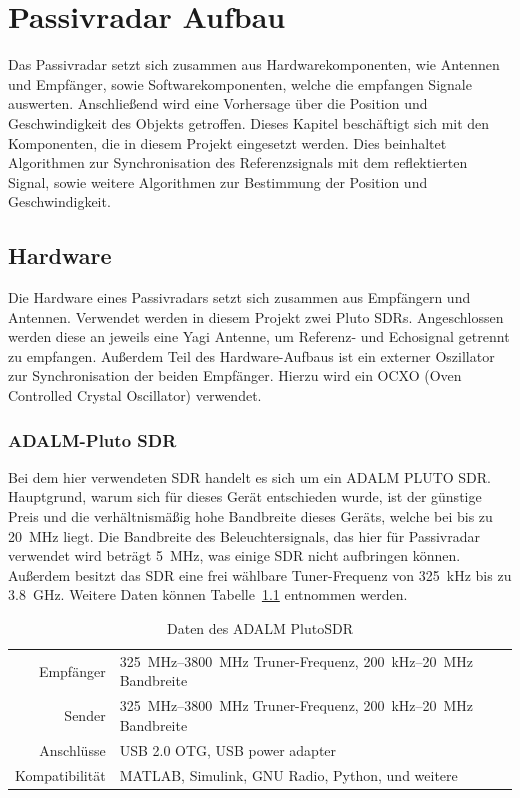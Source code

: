 \chapter{Passivradar Aufbau}\label{sct:setup}
Das Passivradar setzt sich zusammen aus Hardwarekomponenten, wie Antennen und Empfänger, sowie Softwarekomponenten, welche die empfangen Signale auswerten. Anschließend wird eine Vorhersage über die Position und Geschwindigkeit des Objekts getroffen. Dieses Kapitel beschäftigt sich mit den Komponenten, die in diesem Projekt eingesetzt werden. Dies beinhaltet Algorithmen zur Synchronisation des Referenzsignals mit dem reflektierten Signal, sowie weitere Algorithmen zur Bestimmung der Position und Geschwindigkeit.
\section{Hardware}
Die Hardware eines Passivradars setzt sich zusammen aus Empfängern und Antennen. Verwendet werden in diesem Projekt zwei Pluto SDRs. Angeschlossen werden diese an jeweils eine Yagi Antenne, um Referenz- und Echosignal getrennt zu empfangen. Außerdem Teil des Hardware-Aufbaus ist ein externer Oszillator zur Synchronisation der beiden Empfänger. Hierzu wird ein OCXO (Oven Controlled Crystal Oscillator) verwendet.
\subsection{ADALM-Pluto SDR}\label{sct:sdr}
Bei dem hier verwendeten SDR handelt es sich um ein ADALM
PLUTO SDR\@. Hauptgrund, warum sich für dieses Gerät entschieden wurde, ist der günstige Preis und die verhältnismäßig hohe Bandbreite dieses Geräts, welche bei bis zu \SI{20}{\mega\hertz} liegt. Die Bandbreite des Beleuchtersignals, das hier für Passivradar verwendet wird beträgt \SI{5}{\mega\hertz}, was einige SDR nicht aufbringen können. Außerdem besitzt das SDR eine frei wählbare Tuner-Frequenz von \SI{325}{\kilo\hertz} bis zu \SI{3.8}{\giga\hertz}. Weitere Daten können Tabelle~\ref{table:sdr} entnommen werden.

\begin{table}
    \centering
    \begin{tabular}[h]{rl}
        Empfänger & \SIrange{325}{3800}{\mega\hertz} Truner-Frequenz, \SI{200}{\kilo\hertz}--\SI{20}{\mega\hertz} Bandbreite \\
        Sender & \SIrange{325}{3800}{\mega\hertz} Truner-Frequenz, \SI{200}{\kilo\hertz}--\SI{20}{\mega\hertz} Bandbreite \\
        Anschlüsse & USB 2.0 OTG, USB power adapter \\
        Kompatibilität & MATLAB, Simulink, GNU Radio, Python, und weitere \\
    \end{tabular}
    \caption{Daten des ADALM PlutoSDR}\label{table:sdr}
\end{table}

